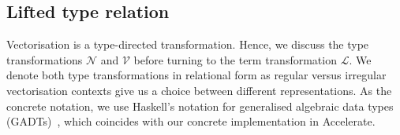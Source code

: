 







\subsection{Lifted type relation}

Vectorisation is a type-directed transformation. Hence, we discuss the type transformations $\mathcal{N}$ and $\mathcal{V}$ before turning to the term transformation $\mathcal{L}$. We denote both type transformations in relational form as regular versus irregular vectorisation contexts give us a choice between different representations. As the concrete notation, we use Haskell's notation for generalised algebraic data types (GADTs)~\citep{Jones:2006eh}, which coincides with our concrete implementation in Accelerate.

